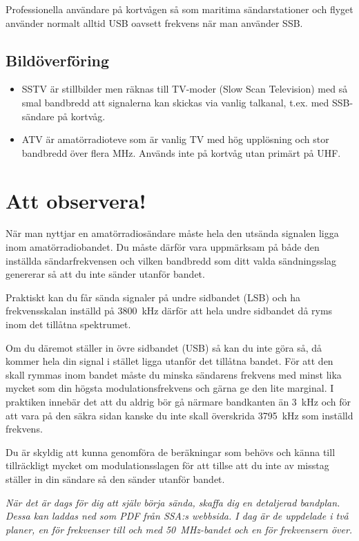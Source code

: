 Professionella användare på kortvågen så som maritima sändarstationer och flyget använder normalt alltid USB oavsett frekvens när man använder SSB.

\subsection{Bildöverföring}

\begin{itemize}
	\item SSTV är stillbilder men räknas till TV-moder (Slow Scan Television) med så smal bandbredd att signalerna kan skickas via vanlig talkanal, t.ex. med SSB-sändare på kortvåg.
	\item ATV är amatörradioteve som är vanlig TV med hög upplösning och stor bandbredd över flera MHz. Används inte på kortvåg utan primärt på UHF.
\end{itemize}


\section{Att observera!}

När man nyttjar en amatörradiosändare måste hela den utsända signalen ligga inom amatörradiobandet. Du måste därför vara uppmärksam på både den inställda sändarfrekvensen och vilken bandbredd som ditt valda sändningsslag genererar så att du inte sänder utanför bandet.

Praktiskt kan du får sända signaler på undre sidbandet (LSB) och ha frekvensskalan inställd på \SI{3800}{kHz} därför att hela undre sidbandet då ryms inom det tillåtna spektrumet. 

Om du däremot ställer in övre sidbandet (USB) så kan du inte göra så, då kommer hela din signal i stället ligga utanför det tillåtna bandet. För att den skall rymmas inom bandet måste du minska sändarens frekvens med minst lika mycket som din högsta modulationsfrekvens och gärna ge den lite marginal. I praktiken innebär det att du aldrig bör gå närmare bandkanten än \SI{3}{kHz} och för att vara på den säkra sidan kanske du inte skall överskrida \SI{3795}{kHz} som inställd frekvens.

Du är skyldig att kunna genomföra de beräkningar som behövs och känna till tillräckligt mycket om modulationsslagen för att tillse att du inte av misstag ställer in din sändare så den sänder utanför bandet.

\emph{När det är dags för dig att själv börja sända, skaffa dig en detaljerad bandplan. Dessa kan laddas ned som PDF från SSA:s webbsida. I dag är de uppdelade i två planer, en för frekvenser till och med \SI{50}{MHz}-bandet och en för frekvensern över.}

